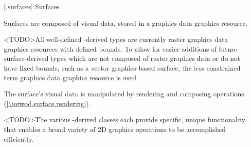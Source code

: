 
 [\iotwod.surfaces] {Surfaces}

\pnum
Surfaces are composed of visual data, stored in a graphics data graphics resource.
\begin{note}
<TODO>All well-defined -derived types are currently raster graphics data graphics resources with defined bounds. To allow for easier additions of future surface-derived types which are not composed of raster graphics data or do not have fixed bounds, such as a vector graphics-based surface, the less constrained term graphics data graphics resource is used.
\end{note}

\pnum
The surface's visual data is manipulated by rendering and composing operations (\ref{\iotwod.surface.rendering}).

\pnum
<TODO>The various -derived classes each provide specific, unique functionality that enables a broad variety of 2D graphics operations to be accomplished efficiently.

\addtocounter{SectionDepthBase}{1}


















\addtocounter{SectionDepthBase}{-1}
